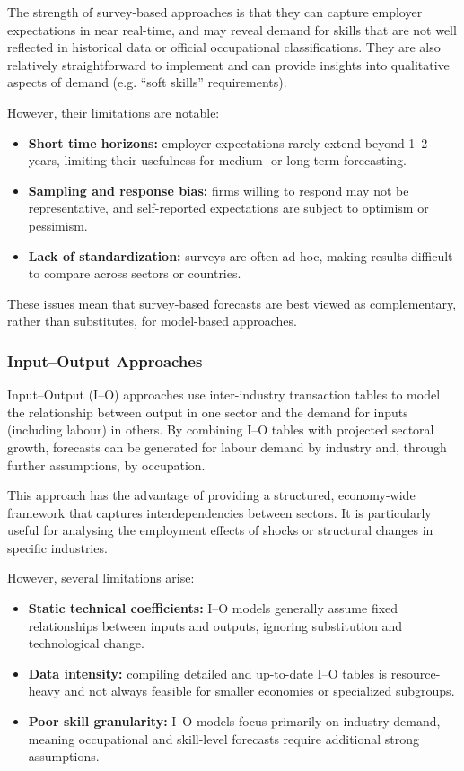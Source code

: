 The strength of survey-based approaches is that they can capture employer expectations in near real-time, and may reveal demand for skills that are not well reflected in historical data or official occupational classifications.
They are also relatively straightforward to implement and can provide insights into qualitative aspects of demand (e.g. ``soft skills'' requirements).

However, their limitations are notable:
\begin{itemize}
  \item \textbf{Short time horizons:} employer expectations rarely extend beyond 1--2 years, limiting their usefulness for medium- or long-term forecasting.
  \item \textbf{Sampling and response bias:} firms willing to respond may not be representative, and self-reported expectations are subject to optimism or pessimism.
  \item \textbf{Lack of standardization:} surveys are often ad hoc, making results difficult to compare across sectors or countries.
\end{itemize}

These issues mean that survey-based forecasts are best viewed as complementary, rather than substitutes, for model-based approaches.

\subsubsection{Input–Output Approaches~\cite{parikh_1980_InputoutputApproach,wilson_2001_ForecastingSkill}}
Input–Output (I--O) approaches use inter-industry transaction tables to model the relationship between output in one sector and the demand for inputs (including labour) in others.
By combining I--O tables with projected sectoral growth, forecasts can be generated for labour demand by industry and, through further assumptions, by occupation.

This approach has the advantage of providing a structured, economy-wide framework that captures interdependencies between sectors.
It is particularly useful for analysing the employment effects of shocks or structural changes in specific industries.

However, several limitations arise:
\begin{itemize}
  \item \textbf{Static technical coefficients:} I--O models generally assume fixed relationships between inputs and outputs, ignoring substitution and technological change.
  \item \textbf{Data intensity:} compiling detailed and up-to-date I--O tables is resource-heavy and not always feasible for smaller economies or specialized subgroups.
  \item \textbf{Poor skill granularity:} I--O models focus primarily on industry demand, meaning occupational and skill-level forecasts require additional strong assumptions.
\end{itemize}

